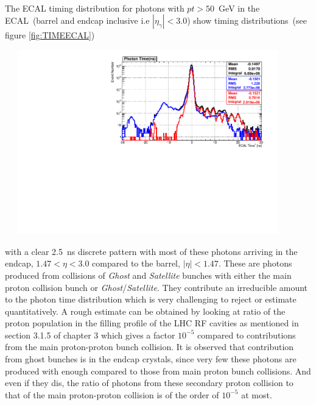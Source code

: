 \paragraph*{}
The ECAL timing distribution for photons with $pt > 50$~GeV in the ECAL~(barrel and endcap inclusive i.e $|\eta_{\gamma}| < 3.0$) show timing distributions~(see figure \ref{fig:TIMEECAL})

\begin{center}
\centering
\mbox{
\includegraphics[height=8cm, width=0.9\textwidth]{THESISPLOTS/PhotonECALTimePtMTH50-C-D-SinglePhotonDataset.pdf}
}
\label{fig:TIMEECAL}
\end{center}
with a clear 2.5~ns discrete pattern with most of these photons arriving in the endcap, $ 1.47 < \eta < 3.0$ compared to the barrel, $|\eta| < 1.47$. These are photons produced from collisions of \textit{Ghost} and \textit{Satellite} bunches with either the main proton collision bunch or \textit{Ghost}/\textit{Satellite}. They contribute an irreducible amount to the photon time distribution which is very challenging to reject or estimate quantitatively. A rough estimate can be obtained by looking at ratio of the proton population in the filling profile of the LHC RF cavities as mentioned in section 3.1.5 of chapter 3 which gives a factor $10^{-5}$ compared to contributions from the main proton-proton bunch collision. It is observed that contribution from ghost bunches is in the endcap crystals, since very few these photons are produced with enough \pt compared to those from main proton bunch collisions. And even if they dis, the ratio of photons from these secondary proton collision to that of the main proton-proton collision is of the order of $10^{-5}$ at most. 
